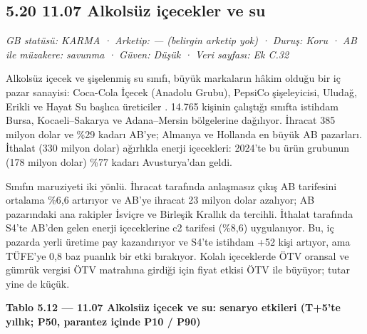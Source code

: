 \hypertarget{nace_kartlar_10-12-520-1107-alkolsuxfcz-iuxe7ecekler-ve-su}{%
\subsection{5.20 11.07 Alkolsüz içecekler ve su}\label{nace_kartlar_10-12-520-1107-alkolsuxfcz-iuxe7ecekler-ve-su}}

\emph{GB statüsü: KARMA · Arketip: --- (belirgin arketip yok) · Duruş: Koru · AB ile müzakere: savunma · Güven: Düşük · Veri sayfası: Ek C.32}

Alkolsüz içecek ve şişelenmiş su sınıfı, büyük markaların hâkim olduğu bir iç pazar sanayisi: Coca-Cola İçecek (Anadolu Grubu), PepsiCo şişeleyicisi, Uludağ, Erikli ve Hayat Su başlıca üreticiler \etiketH{}. 14.765 kişinin çalıştığı sınıfta istihdam Bursa, Kocaeli--Sakarya ve Adana--Mersin bölgelerine dağılıyor. İhracat 385 milyon dolar ve \%29 kadarı AB'ye; Almanya ve Hollanda en büyük AB pazarları. İthalat (330 milyon dolar) ağırlıkla enerji içecekleri: 2024'te bu ürün grubunun (178 milyon dolar) \%77 kadarı Avusturya'dan geldi.

Sınıfın maruziyeti iki yönlü. İhracat tarafında anlaşmasız çıkış AB tarifesini ortalama \%6,6 artırıyor ve AB'ye ihracat 23 milyon dolar azalıyor; AB pazarındaki ana rakipler İsviçre ve Birleşik Krallık da tercihli. İthalat tarafında S4'te AB'den gelen enerji içeceklerine c2 tarifesi (\%8,6) uygulanıyor. Bu, iç pazarda yerli üretime pay kazandırıyor ve S4'te istihdam +52 kişi artıyor, ama TÜFE'ye 0,8 baz puanlık bir etki bırakıyor. Kolalı içeceklerde ÖTV oransal ve gümrük vergisi ÖTV matrahına girdiği için fiyat etkisi ÖTV ile büyüyor; tutar yine de küçük.


\textbf{Tablo 5.12 --- 11.07 Alkolsüz içecek ve su: senaryo etkileri (T+5'te yıllık; P50, parantez içinde P10 / P90)}

\nopagebreak[4]

\begingroup\gbtablo\small

